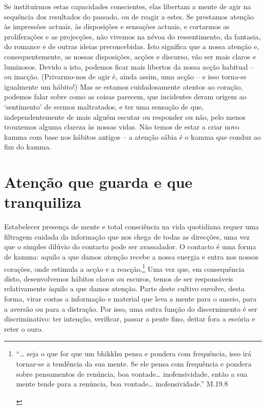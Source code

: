 Se instituirmos estas capacidades conscientes, elas libertam a mente de agir na
sequência dos resultados do passado, ou de reagir a estes. Se prestamos atenção
às impressões actuais, às disposições e sensações actuais, e cortarmos as
proliferações e as projecções, não vivemos na névoa do ressentimento, da
fantasia, do romance e de outras ideias preconcebidas. Isto significa que a
nossa atenção e, consequentemente, as nossas disposições, acções e discurso, vão
ser mais claros e luminosos. Devido a isto, podemos ficar mais libertos da nossa
acção habitual -- ou inacção. (Privarmo-nos de agir é, ainda assim, uma acção --
e isso torna-se igualmente um hábito!) Mas se estamos cuidadosamente atentos ao
coração, podemos falar sobre como as coisas parecem, que incidentes deram origem
ao `sentimento' de sermos maltratados, e ter uma sensação de que,
independentemente de mais alguém escutar ou responder ou não, pelo menos
trouxemos alguma clareza às nossas vidas. Não temos de estar a criar novo kamma
com base nos hábitos antigos -- a atenção sábia é o kamma que conduz ao fim do
kamma.

\section{Atenção que guarda e que tranquiliza}

Estabelecer presença de mente e total consciência na vida quotidiana requer uma filtragem cuidada da informação que nos chega de todas as direcções, uma vez que o simples dilúvio do contacto pode ser avassalador. O contacto é uma forma de kamma: aquilo a que damos atenção recebe a nossa energia e entra nos nossos corações, onde estimula a acção e a reacção.\footnote{``\ldots{} seja o que for que um bhikkhu pensa e pondera com frequência, isso irá tornar-se a tendência da sua mente. Se ele pensa com frequência e pondera sobre pensamentos de renúncia, boa vontade\ldots{} inofensividade, então a sua mente tende para a renúncia, boa vontade\ldots{} inofensividade.'' M.19.8

  \hl{}} Uma vez que, em consequência disto, desenvolvemos hábitos claros ou escuros, temos de ser responsáveis relativamente àquilo a que damos atenção. Parte deste cultivo envolve, desta forma, virar costas a informação e material que leva a mente para o anseio, para a aversão ou para a distração. Por isso, uma outra função do discernimento é ser discriminativo: ter intenção, verificar, passar a pente fino, deitar fora a escória e reter o ouro.

